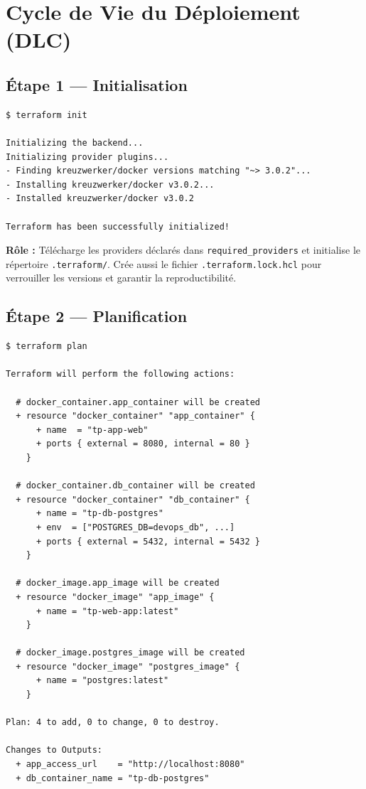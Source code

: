 \documentclass[12pt,a4paper]{article}
\begin{document}
\section{\textcolor{terraformPurple}{Cycle de Vie du Déploiement (DLC)}}

\subsection{Étape 1 --- Initialisation}

\begin{lstlisting}[style=termStyle, caption=terraform init]
$ terraform init

Initializing the backend...
Initializing provider plugins...
- Finding kreuzwerker/docker versions matching "~> 3.0.2"...
- Installing kreuzwerker/docker v3.0.2...
- Installed kreuzwerker/docker v3.0.2

Terraform has been successfully initialized!
\end{lstlisting}

\begin{tfbox}
\textbf{Rôle :} Télécharge les providers déclarés dans \texttt{required\_providers}
et initialise le répertoire \texttt{.terraform/}. Crée aussi le fichier
\texttt{.terraform.lock.hcl} pour verrouiller les versions et garantir
la reproductibilité.
\end{tfbox}

\subsection{Étape 2 --- Planification}

\begin{lstlisting}[style=termStyle, caption=terraform plan]
$ terraform plan

Terraform will perform the following actions:

  # docker_container.app_container will be created
  + resource "docker_container" "app_container" {
      + name  = "tp-app-web"
      + ports { external = 8080, internal = 80 }
    }

  # docker_container.db_container will be created
  + resource "docker_container" "db_container" {
      + name = "tp-db-postgres"
      + env  = ["POSTGRES_DB=devops_db", ...]
      + ports { external = 5432, internal = 5432 }
    }

  # docker_image.app_image will be created
  + resource "docker_image" "app_image" {
      + name = "tp-web-app:latest"
    }

  # docker_image.postgres_image will be created
  + resource "docker_image" "postgres_image" {
      + name = "postgres:latest"
    }

Plan: 4 to add, 0 to change, 0 to destroy.

Changes to Outputs:
  + app_access_url    = "http://localhost:8080"
  + db_container_name = "tp-db-postgres"
\end{lstlisting}
\end{document}
